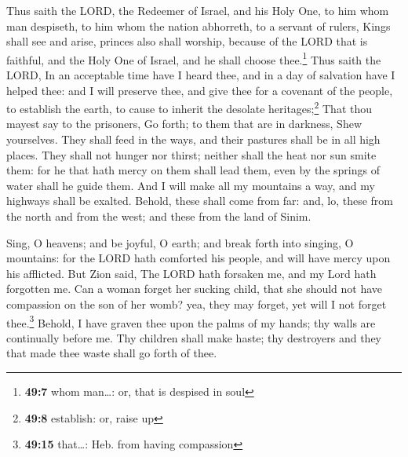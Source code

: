  Thus saith the LORD, the Redeemer of Israel, and his Holy
One, to him whom man despiseth, to him whom the nation abhorreth, to a
servant of rulers, Kings shall see and arise, princes also shall
worship, because of the LORD that is faithful, and the Holy One of
Israel, and he shall choose thee.\footnote{\textbf{49:7} whom man\ldots:
  or, that is despised in soul}  Thus saith the LORD, In
an acceptable time have I heard thee, and in a day of salvation have I
helped thee: and I will preserve thee, and give thee for a covenant of
the people, to establish the earth, to cause to inherit the desolate
heritages;\footnote{\textbf{49:8} establish: or, raise up}
 That thou mayest say to the prisoners, Go forth; to them
that are in darkness, Shew yourselves. They shall feed in the ways, and
their pastures shall be in all high places.  They shall
not hunger nor thirst; neither shall the heat nor sun smite them: for he
that hath mercy on them shall lead them, even by the springs of water
shall he guide them.  And I will make all my mountains a
way, and my highways shall be exalted.  Behold, these
shall come from far: and, lo, these from the north and from the west;
and these from the land of Sinim.

 Sing, O heavens; and be joyful, O earth; and break forth
into singing, O mountains: for the LORD hath comforted his people, and
will have mercy upon his afflicted.  But Zion said, The
LORD hath forsaken me, and my Lord hath forgotten me. 
Can a woman forget her sucking child, that she should not have
compassion on the son of her womb? yea, they may forget, yet will I not
forget thee.\footnote{\textbf{49:15} that\ldots: Heb. from having
  compassion}  Behold, I have graven thee upon the palms
of my hands; thy walls are continually before me.  Thy
children shall make haste; thy destroyers and they that made thee waste
shall go forth of thee.

